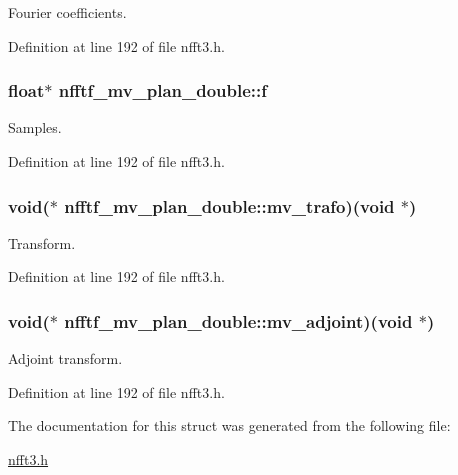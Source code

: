 Fourier coefficients. 



Definition at line 192 of file nfft3.\-h.

\hypertarget{structnfftf__mv__plan__double_a0b25cac2771ce5e3048ddc1b708e9005}{
\subsubsection[{f}]{\setlength{\rightskip}{0pt plus 5cm}float$\ast$ nfftf\-\_\-mv\-\_\-plan\-\_\-double\-::f}}\label{structnfftf__mv__plan__double_a0b25cac2771ce5e3048ddc1b708e9005}


Samples. 



Definition at line 192 of file nfft3.\-h.

\hypertarget{structnfftf__mv__plan__double_a130252f4a197b65416311097880cff4f}{
\subsubsection[{mv\-\_\-trafo}]{\setlength{\rightskip}{0pt plus 5cm}void($\ast$ nfftf\-\_\-mv\-\_\-plan\-\_\-double\-::mv\-\_\-trafo)(void $\ast$)}}\label{structnfftf__mv__plan__double_a130252f4a197b65416311097880cff4f}


Transform. 



Definition at line 192 of file nfft3.\-h.

\hypertarget{structnfftf__mv__plan__double_a3d0e47cf55f04c89523abd46f361ef91}{
\subsubsection[{mv\-\_\-adjoint}]{\setlength{\rightskip}{0pt plus 5cm}void($\ast$ nfftf\-\_\-mv\-\_\-plan\-\_\-double\-::mv\-\_\-adjoint)(void $\ast$)}}\label{structnfftf__mv__plan__double_a3d0e47cf55f04c89523abd46f361ef91}


Adjoint transform. 



Definition at line 192 of file nfft3.\-h.



The documentation for this struct was generated from the following file\-:\begin{DoxyCompactItemize}
\item 
\hyperlink{nfft3_8h}{nfft3.\-h}\end{DoxyCompactItemize}
